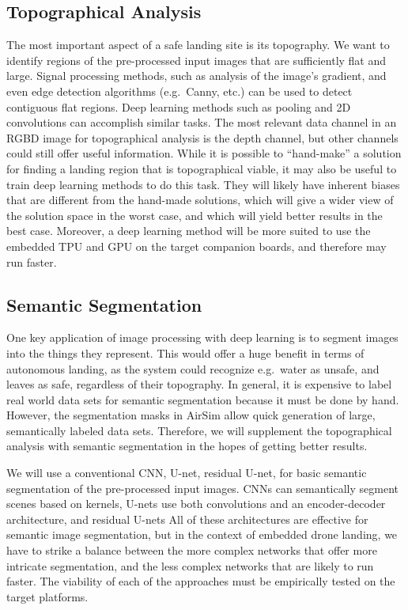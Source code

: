 \subsection{Topographical Analysis}

The most important aspect of a safe landing site is its topography.
We want to identify regions of the pre-processed input images that are sufficiently flat and large.
Signal processing methods, such as analysis of the image's gradient, and even edge detection algorithms (e.g.~Canny, etc.)
can be used to detect contiguous flat regions.
Deep learning methods such as pooling and 2D convolutions can accomplish similar tasks.
The most relevant data channel in an RGBD image for topographical analysis is the depth channel,
but other channels could still offer useful information.
While it is possible to ``hand-make'' a solution for finding a landing region that is topographical viable,
it may also be useful to train deep learning methods to do this task.
They will likely have inherent biases that are different from the hand-made solutions,
which will give a wider view of the solution space in the worst case,
and which will yield better results in the best case.
Moreover, a deep learning method will be more suited to use the embedded TPU and GPU on the target companion boards,
and therefore may run faster.

\subsection{Semantic Segmentation}

One key application of image processing with deep learning is to segment images into the things they represent.
This would offer a huge benefit in terms of autonomous landing, as the system could recognize e.g.~water as unsafe,
and leaves as safe, regardless of their topography.
In general, it is expensive to label real world data sets for semantic segmentation because it must be done by hand.
However, the segmentation masks in AirSim allow quick generation of large, semantically labeled data sets.
Therefore, we will supplement the topographical analysis with semantic segmentation in the hopes of getting better results.

We will use a conventional CNN, U-net, residual U-net, for basic semantic segmentation of the pre-processed input images.
CNNs can semantically segment scenes based on kernels, U-nets use both convolutions and an encoder-decoder architecture,
and residual U-nets
All of these architectures are effective for semantic image segmentation, but in the context of embedded drone landing,
we have to strike a balance between the more complex networks that offer more intricate segmentation,
and the less complex networks that are likely to run faster.
The viability of each of the approaches must be empirically tested on the target platforms.

